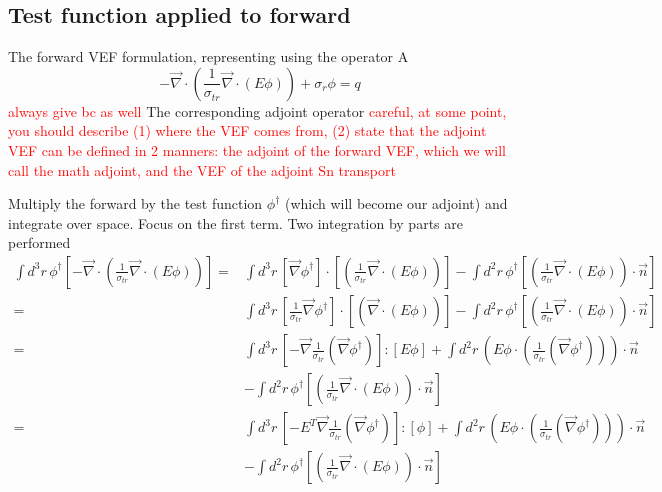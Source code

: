 \documentclass{article}
\newcommand{\vdiv}{\vec{\nabla} \cdot}
\newcommand{\vgrad}{\vec{\nabla}}
\begin{document}
\subsection{Test function applied to forward}
The forward VEF formulation, representing using the operator A
\[ -\vdiv \left( \frac{1}{\sigma_{tr}} \vdiv \left( E \phi \right) \right)
+ \sigma_r \phi
= q
\]
\textcolor{red}{always give bc as well}
The corresponding adjoint operator \textcolor{red}{careful, at some point, you should describe (1) where the VEF comes from, (2) state that the adjoint VEF can be defined in 2 manners: the adjoint of the forward VEF, which we will call the math adjoint, and the VEF of the adjoint Sn transport}


Multiply the forward by the test function $\phi^\dag$ (which will become our adjoint) and integrate over space. Focus on the first term. Two integration by parts are performed
\begin{align*}
\int d^3r \, \phi^\dag \left[  -\vdiv \left( \frac{1}{\sigma_{tr}} \vdiv \left( E \phi \right) \right) \right] 
=& \int d^3r \, \left[ \vgrad \phi^\dag \right] \cdot \left[ \left( \frac{1}{\sigma_{tr}} \vdiv \left( E \phi \right) \right) \right] 
- \int d^2 r \, \phi^\dag \left[ \left( \frac{1}{\sigma_{tr}} \vdiv \left( E \phi \right) \right) \cdot \vec{n} \right] \\
=& \int d^3r \, \left[ \frac{1}{\sigma_{tr}} \vgrad \phi^\dag \right] \cdot \left[ \left(  \vdiv \left( E \phi \right) \right) \right] 
- \int d^2 r \, \phi^\dag \left[ \left( \frac{1}{\sigma_{tr}} \vdiv \left( E \phi \right) \right) \cdot \vec{n} \right] \\
=& \int d^3r \, \left[- \vgrad \frac{1}{ \sigma_{tr}} \left(  \vgrad \phi^\dag \right) \right] : \left[ E \phi \right]
+ \int d^2 r \, \left( E \phi \cdot \left( \frac{1}{ \sigma_{tr}} \left(  \vgrad \phi^\dag \right) \right) \right) \cdot \vec{n} \\
&- \int d^2 r \, \phi^\dag \left[ \left( \frac{1}{\sigma_{tr}} \vdiv \left( E \phi \right) \right) \cdot \vec{n} \right]\\
=& \int d^3r \, \left[- E^T \vgrad \frac{1}{ \sigma_{tr}} \left(  \vgrad \phi^\dag \right) \right] : \left[ \phi \right] 
+ \int d^2 r \, \left( E \phi \cdot \left( \frac{1}{ \sigma_{tr}} \left(  \vgrad \phi^\dag \right) \right) \right) \cdot \vec{n} \\
&- \int d^2 r \, \phi^\dag \left[ \left( \frac{1}{\sigma_{tr}} \vdiv \left( E \phi \right) \right) \cdot \vec{n} \right]
\end{align*}
\end{document}
